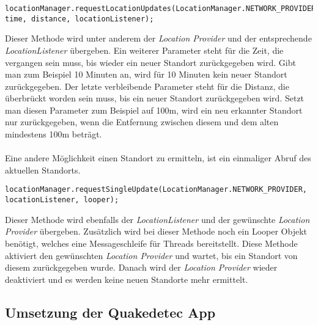 \begin{lstlisting}[caption={requestLocationUpdates},label=lst:requestLocationUpdates, basicstyle=\small]
locationManager.requestLocationUpdates(LocationManager.NETWORK_PROVIDER, time, distance, locationListener);
\end{lstlisting}

Dieser Methode wird unter anderem der \textit{Location Provider} und der entsprechende \textit{LocationListener} übergeben. Ein weiterer Parameter steht für die Zeit, die vergangen sein muss, bis wieder ein neuer Standort zurückgegeben wird. Gibt man zum Beispiel 10 Minuten an, wird für 10 Minuten kein neuer Standort zurückgegeben. 
Der letzte verbleibende Parameter steht für die Distanz, die überbrückt worden sein muss, bis ein neuer Standort zurückgegeben wird. Setzt man diesen Parameter zum Beispiel auf 100m, wird ein neu erkannter Standort nur zurückgegeben, wenn die Entfernung zwischen diesem und dem alten mindestens 100m beträgt. 
\\
\\
Eine andere Möglichkeit einen Standort zu ermitteln, ist ein einmaliger Abruf des aktuellen Standorts.
\begin{lstlisting}[caption={requestSingleUpdate},label=lst:requestSingleUpdate, basicstyle=\small]
locationManager.requestSingleUpdate(LocationManager.NETWORK_PROVIDER, locationListener, looper);
\end{lstlisting}

Dieser Methode wird ebenfalls der \textit{LocationListener} und der gewünschte \textit{Location Provider} übergeben. Zusätzlich wird bei dieser Methode noch ein Looper Objekt benötigt, welches eine Messageschleife für Threads bereitstellt.
Diese Methode aktiviert den gewünschten \textit{Location Provider} und wartet, bis ein Standort von diesem zurückgegeben wurde. Danach wird der \textit{Location Provider} wieder deaktiviert und es werden keine neuen Standorte mehr ermittelt.

\subsection{Umsetzung der Quakedetec App}
